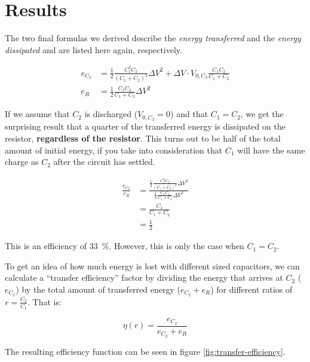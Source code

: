 \section{Results}

The two final formulas we derived describe the \textit{energy transferred} and
the  \textit{energy  dissipated}  and  are listed  here  again,  respectively.

\begin{align}
    e_{C_2} &= \frac{1}{2}\frac{C_1^2C_2}{\left(C_1+C_2\right)^2}{\Delta V}^2 + \Delta V\cdot V_{0,C_2}\frac{C_1C_2}{C_1+C_2} \label{eq:capacitor-energy2} \\
    e_R     &= \frac{1}{2}\frac{C_1C_2}{C_1+C_2}{\Delta V}^2 \label{eq:resistor-energy2}
\end{align}

If we assume that $C_2$ is discharged ($V_{0,C_2} = 0$) and that $C_1=C_2$, we
get  the  surprising  result  that a quarter  of  the  transferred  energy  is
dissipated  on  the  resistor, \textbf{regardless of the resistor}. This turns
out to be half of  the  total  amount  of  initial  energy,  if  you take into
consideration that $C_1$ will have the same charge  as $C_2$ after the circuit
has settled.

\begin{align}
    \frac{e_{C_2}}{e_R} &= \frac{\frac{1}{2}\frac{C_1^2C_2}{\left(C_1+C_2\right)^2}\Delta V^2}{\frac{1}{2}\frac{C_1C_2}{C_1+C_2}\Delta V^2} \\
                        &= \frac{C_1}{C_1+C_2} \\
                        &= \frac{1}{2}
\end{align}

This  is an efficiency of \SI{33}{\percent}. However, this is  only  the  case
when $C_1=C_2$.

To get an idea of how much energy is lost  with different sized capacitors, we
can calculate a  ``transfer  efficiency''  factor  by dividing the energy that
arrives  at  $C_2$  ($e_{C_2}$)  by  the total amount  of  transferred  energy
($e_{C_2}  + e_R$) for  different  ratios  of  $r=\frac{C_2}{C_1}$.  That  is:

\begin{equation}
    \eta(r) = \frac{e_{C_2}}{e_{C_2} + e_R}
\end{equation}

The    resulting    efficiency    function    can    be    seen   in    figure
\ref{fig:transfer-efficiency}.

